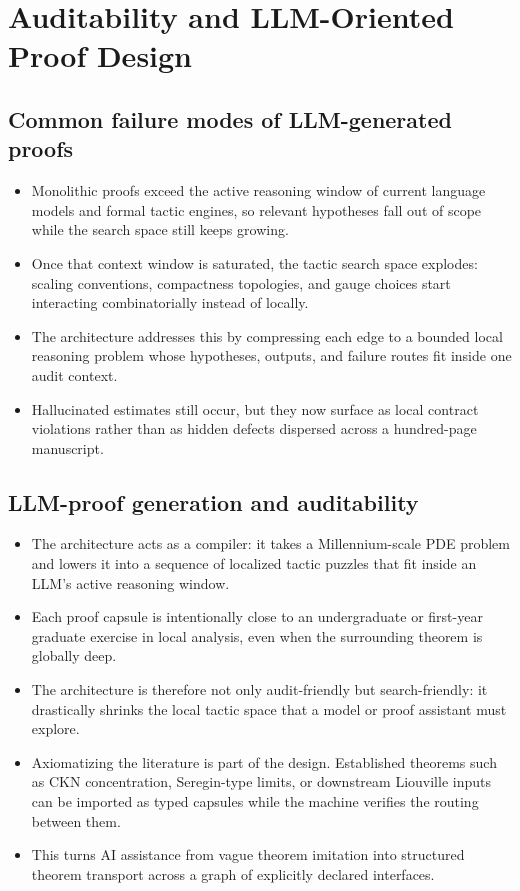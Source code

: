 \documentclass[11pt]{article}
\theoremstyle{plain}
\theoremstyle{definition}
\theoremstyle{remark}
\begin{document}
\section{Auditability and LLM-Oriented Proof Design}
\label{sec:auditability}

\subsection{Common failure modes of LLM-generated proofs}
\begin{itemize}
  \item Monolithic proofs exceed the active reasoning window of current language models and formal tactic engines, so relevant hypotheses fall out of scope while the search space still keeps growing.
  \item Once that context window is saturated, the tactic search space explodes: scaling conventions, compactness topologies, and gauge choices start interacting combinatorially instead of locally.
  \item The architecture addresses this by compressing each edge to a bounded local reasoning problem whose hypotheses, outputs, and failure routes fit inside one audit context.
  \item Hallucinated estimates still occur, but they now surface as local contract violations rather than as hidden defects dispersed across a hundred-page manuscript.
\end{itemize}

\subsection{LLM-proof generation and auditability}
\begin{itemize}
  \item The architecture acts as a compiler: it takes a Millennium-scale PDE problem and lowers it into a sequence of localized tactic puzzles that fit inside an LLM's active reasoning window.
  \item Each proof capsule is intentionally close to an undergraduate or first-year graduate exercise in local analysis, even when the surrounding theorem is globally deep.
  \item The architecture is therefore not only audit-friendly but search-friendly: it drastically shrinks the local tactic space that a model or proof assistant must explore.
  \item Axiomatizing the literature is part of the design.  Established theorems such as CKN concentration, Seregin-type limits, or downstream Liouville inputs can be imported as typed capsules while the machine verifies the routing between them.
  \item This turns AI assistance from vague theorem imitation into structured theorem transport across a graph of explicitly declared interfaces.
\end{itemize}
\end{document}
